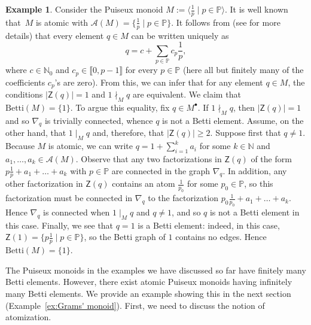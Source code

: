 \documentclass[12pt]{amsart}
\theoremstyle{definition}
\newtheorem{example}[theorem]{Example}
\numberwithin{equation}{section}
\newcommand{\nn}{\mathbb{N}}
\newcommand{\pp}{\mathbb{P}}
\providecommand\ldb{\llbracket}
\providecommand\rdb{\rrbracket}
\begin{document}
\begin{example} \label{ex:Betti elements of the reciprocal PM}
	Consider the Puiseux monoid $M := \big\langle \frac1p \mid p \in \pp \big\rangle$. It is well known that~$M$ is atomic with $\mathcal{A}(M) = \big\{ \frac1p \mid p \in \pp \big\}$.  It follows from \cite[Example~3.3]{AG22} (see \cite[Proposition~4.2(2)]{fG22} for more details) that every element $q \in M$ can be written uniquely as
	\[
		q = c + \sum_{p \in \pp} c_p \frac1p,
	\] 
	where $c \in \nn_0$ and $c_p \in \ldb 0, p-1 \rdb$ for every $p \in \pp$ (here all but finitely many of the coefficients $c_p$'s are zero). From this, we can infer that for any element $q \in M$, the conditions $|\mathsf{Z}(q)| = 1$ and $1 \nmid_M q$ are equivalent. We claim that $\text{Betti}(M) = \{1\}$. To argue this equality, fix $q \in M^\bullet$. If $1 \nmid_M q$, then $|\mathsf{Z}(q)| = 1$ and so $\nabla_q$ is trivially connected, whence $q$ is not a Betti element. Assume, on the other hand, that $1 \mid_M q$ and, therefore, that $|\mathsf{Z}(q)| \ge 2$. Suppose first that $q \neq 1$. Because $M$ is atomic, we can write $q = 1 + \sum_{i=1}^k a_i$ for some $k \in \nn$ and $a_1, \dots, a_k \in \mathcal{A}(M)$. Observe that any two factorizations in $\mathsf{Z}(q)$ of the form $p \frac1p + a_1 + \dots + a_k$ with $p \in \pp$ are connected in the graph $\nabla_q$. In addition, any other factorization in $\mathsf{Z}(q)$ contains an atom $\frac{1}{p_0}$ for some $p_0 \in \pp$, so this factorization must be connected in $\nabla_q$ to the factorization $p_0 \frac1{p_0} + a_1 + \dots + a_k$. Hence $\nabla_q$ is connected when $1 \mid_ M q$ and $q \neq 1$, and so $q$ is not a Betti element in this case. Finally, we see that $q = 1$ is a Betti element: indeed, in this case, $\mathsf{Z}(1) = \big\{ p \frac1p \mid p \in \pp \}$, so the Betti graph of $1$ contains no edges. Hence $\text{Betti}(M) = \{1\}$.
\end{example}

The Puiseux monoids in the examples we have discussed so far have finitely many Betti elements. However, there exist atomic Puiseux monoids having infinitely many Betti elements. We provide an example showing this in the next section (Example~\ref{ex:Grams' monoid}). First, we need to discuss the notion of atomization.












\bigskip
\end{document}
